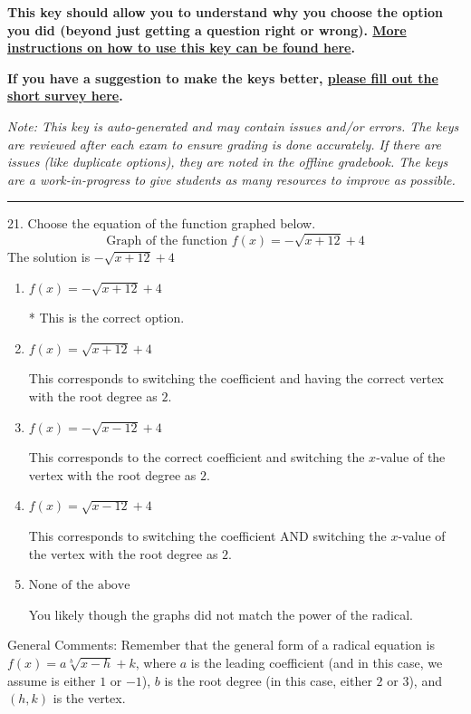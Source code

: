 \documentclass{extbook}[14pt]
\begin{document}
\textbf{This key should allow you to understand why you choose the option you did (beyond just getting a question right or wrong). \href{https://xronos.clas.ufl.edu/mac1105spring2020/courseDescriptionAndMisc/Exams/LearningFromResults}{More instructions on how to use this key can be found here}.}

\textbf{If you have a suggestion to make the keys better, \href{https://forms.gle/CZkbZmPbC9XALEE88}{please fill out the short survey here}.}

\textit{Note: This key is auto-generated and may contain issues and/or errors. The keys are reviewed after each exam to ensure grading is done accurately. If there are issues (like duplicate options), they are noted in the offline gradebook. The keys are a work-in-progress to give students as many resources to improve as possible.}

\rule{\textwidth}{0.4pt}

21. Choose the equation of the function graphed below.
\[ \text{Graph of the function } f(x) = - \sqrt{x + 12} + 4 \] 
The solution is $ - \sqrt{x + 12} + 4 $ 

\begin{enumerate}[label=\Alph*.] 
\item $ f(x) = - \sqrt{x + 12} + 4 $ 

 * This is the correct option. 
\item $ f(x) = \sqrt{x + 12} + 4 $ 

 This corresponds to switching the coefficient and having the correct vertex with the root degree as $2$. 
\item $ f(x) = - \sqrt{x - 12} + 4 $ 

 This corresponds to the correct coefficient and switching the $x$-value of the vertex with the root degree as $2$. 
\item $ f(x) = \sqrt{x - 12} + 4 $ 

 This corresponds to switching the coefficient AND switching the $x$-value of the vertex with the root degree as $2$. 
\item $ \text{None of the above} $ 

 You likely though the graphs did not match the power of the radical. 
\end{enumerate} 
 
General Comments: Remember that the general form of a radical equation is $ f(x) = a \sqrt[b]{x - h} + k$, where $a$ is the leading coefficient (and in this case, we assume is either $1$ or $-1$), $b$ is the root degree (in this case, either $2$ or $3$), and $(h, k)$ is the vertex.
\end{document}
